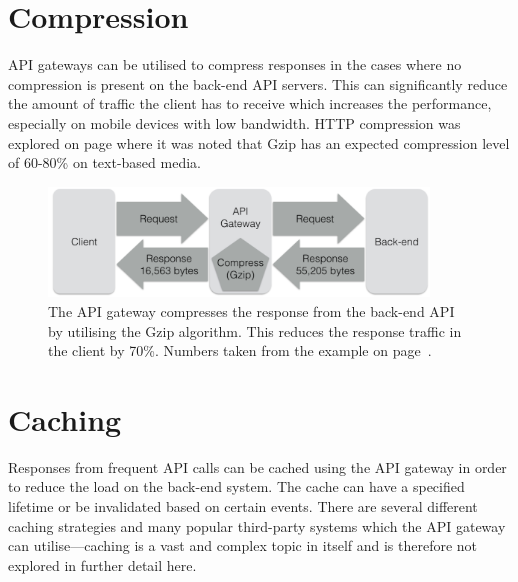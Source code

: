 \documentclass{cslthse-msc}
\begin{document}
\section{Compression}
API gateways can be utilised to compress responses in the cases where no compression is present on the back-end API servers. This can significantly reduce the amount of traffic the client has to receive which increases the performance, especially on mobile devices with low bandwidth. HTTP compression was explored on page \pageref{compression} where it was noted that Gzip has an expected compression level of 60-80\% on text-based media.

\begin{figure}[H]
  \centering
    \begin{center}
      \includegraphics[width=0.9\textwidth]{images/api_gateway_compression.png}
    \end{center}
  \caption{The API gateway compresses the response from the back-end API by utilising the Gzip algorithm. This reduces the response traffic in the client by 70\%. Numbers taken from the example on page~\pageref{compression}.}
\end{figure}

\section{Caching}
\label{caching}
Responses from frequent API calls can be cached using the API gateway in order to reduce the load on the back-end system\cite[page 107]{AASG}. The cache can have a specified lifetime or be invalidated based on certain events. There are several different caching strategies and many popular third-party systems which the API gateway can utilise---caching is a vast and complex topic in itself and is therefore not explored in further detail here.
\end{document}
